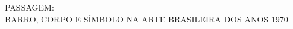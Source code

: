 \documentclass[12pt,a4paper,oneside]{article}
\begin{document}
    \begin{artigoheader}{PASSAGEM:\\BARRO, CORPO E SÍMBOLO NA ARTE BRASILEIRA DOS ANOS 1970}
    \end{artigoheader}
  
    \artigoauthors

    \begin{resumos}
      
      
    \end{resumos}

\printbibliography[heading=bibintoc,title={Referências}]
\end{document}

